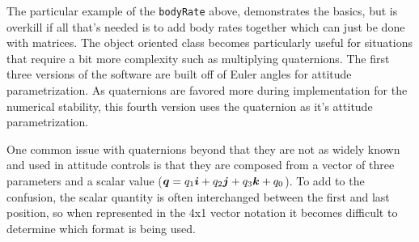 The particular example of the \verb|bodyRate| above, demonstrates the basics, but is overkill if all that's needed is to add body rates together which can just be done with matrices.  The object oriented class becomes particularly useful for situations that require a bit more complexity such as multiplying quaternions.  The first three versions of the software are built off of Euler angles for attitude parametrization.  As quaternions are favored more during implementation for the numerical stability, this fourth version uses the quaternion as it's attitude parametrization.

One common issue with quaternions beyond that they are not as widely known and used in attitude controls is that they are composed from a vector of three parameters and a scalar value ($\boldsymbol{q} = q_1 \boldsymbol{i} + q_2 \boldsymbol{j} + q_3 \boldsymbol{k} + q_0$).  To add to the confusion, the scalar quantity is often interchanged between the first and last position, so when represented in the 4x1 vector notation it becomes difficult to determine which format is being used.

